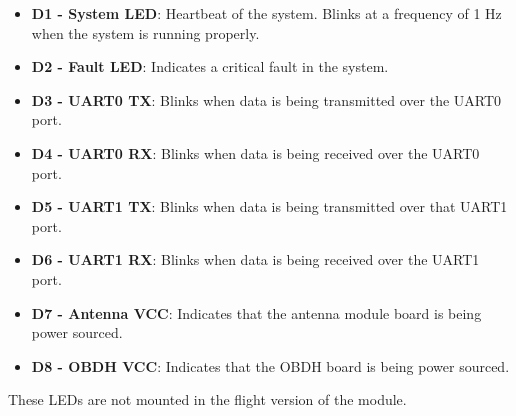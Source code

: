\begin{itemize}
    \item \textbf{D1 - System LED}: Heartbeat of the system. Blinks at a frequency of 1 Hz when the system is running properly.
    \item \textbf{D2 - Fault LED}: Indicates a critical fault in the system.
    \item \textbf{D3 - UART0 TX}: Blinks when data is being transmitted over the UART0 port.
    \item \textbf{D4 - UART0 RX}: Blinks when data is being received over the UART0 port.
    \item \textbf{D5 - UART1 TX}: Blinks when data is being transmitted over that UART1 port.
    \item \textbf{D6 - UART1 RX}: Blinks when data is being received over the UART1 port.
    \item \textbf{D7 - Antenna VCC}: Indicates that the antenna module board is being power sourced.
    \item \textbf{D8 - OBDH VCC}: Indicates that the OBDH board is being power sourced.
\end{itemize}

These LEDs are not mounted in the flight version of the module.
